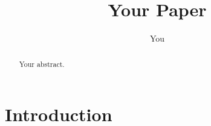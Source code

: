\documentclass{article}
\title{Your Paper}
\author{You}
\begin{document}
\maketitle

\begin{abstract}
Your abstract.
\end{abstract}

\section{Introduction}








\end{document}
